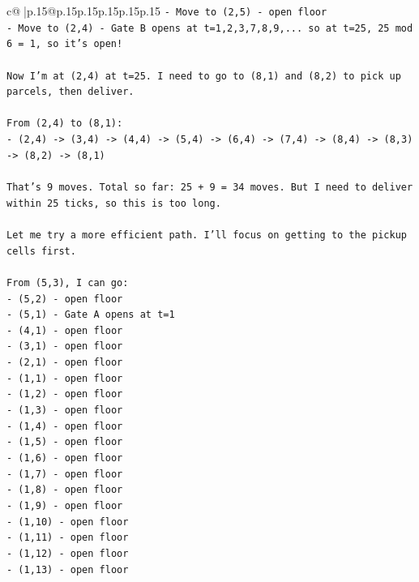 \documentclass{article}
\begin{document}
{\begin{supertabular}{c@{$\;$}|p{.15\linewidth}@{}p{.15\linewidth}p{.15\linewidth}p{.15\linewidth}p{.15\linewidth}p{.15\linewidth}}
{{{\texttt{{-} Move to (2,5) {-} open floor} \\
\texttt{{-} Move to (2,4) {-} Gate B opens at t=1,2,3,7,8,9,... so at t=25, 25 mod 6 = 1, so it's open!} \\
\\ 
\texttt{Now I'm at (2,4) at t=25. I need to go to (8,1) and (8,2) to pick up parcels, then deliver.} \\
\\ 
\texttt{From (2,4) to (8,1):} \\
\texttt{{-} (2,4) {-}> (3,4) {-}> (4,4) {-}> (5,4) {-}> (6,4) {-}> (7,4) {-}> (8,4) {-}> (8,3) {-}> (8,2) {-}> (8,1)} \\
\\ 
\texttt{That's 9 moves. Total so far: 25 + 9 = 34 moves. But I need to deliver within 25 ticks, so this is too long.} \\
\\ 
\texttt{Let me try a more efficient path. I'll focus on getting to the pickup cells first.} \\
\\ 
\texttt{From (5,3), I can go:} \\
\texttt{{-} (5,2) {-} open floor} \\
\texttt{{-} (5,1) {-} Gate A opens at t=1} \\
\texttt{{-} (4,1) {-} open floor} \\
\texttt{{-} (3,1) {-} open floor} \\
\texttt{{-} (2,1) {-} open floor} \\
\texttt{{-} (1,1) {-} open floor} \\
\texttt{{-} (1,2) {-} open floor} \\
\texttt{{-} (1,3) {-} open floor} \\
\texttt{{-} (1,4) {-} open floor} \\
\texttt{{-} (1,5) {-} open floor} \\
\texttt{{-} (1,6) {-} open floor} \\
\texttt{{-} (1,7) {-} open floor} \\
\texttt{{-} (1,8) {-} open floor} \\
\texttt{{-} (1,9) {-} open floor} \\
\texttt{{-} (1,10) {-} open floor} \\
\texttt{{-} (1,11) {-} open floor} \\
\texttt{{-} (1,12) {-} open floor} \\
\texttt{{-} (1,13) {-} open floor} \\
}}}
\end{supertabular}}
\end{document}

